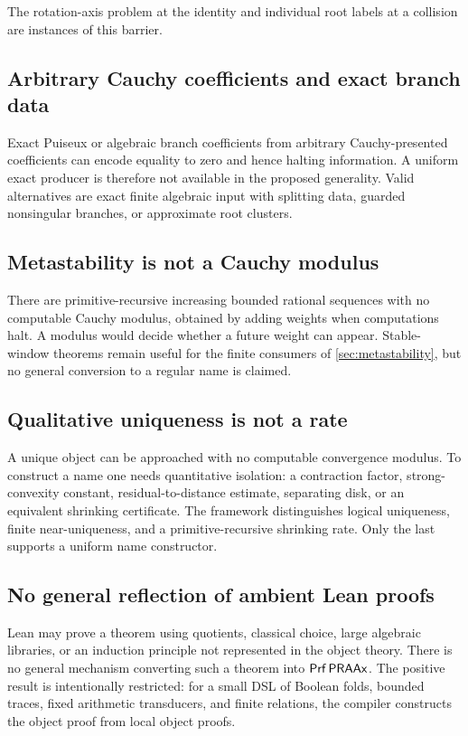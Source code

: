 The rotation-axis problem at the identity and individual root labels at a
collision are instances of this barrier.

\subsection{Arbitrary Cauchy coefficients and exact branch data}

Exact Puiseux or algebraic branch coefficients from arbitrary Cauchy-presented
coefficients can encode equality to zero and hence halting information.  A
uniform exact producer is therefore not available in the proposed generality.
Valid alternatives are exact finite algebraic input with splitting data,
guarded nonsingular branches, or approximate root clusters.

\subsection{Metastability is not a Cauchy modulus}

There are primitive-recursive increasing bounded rational sequences with no
computable Cauchy modulus, obtained by adding weights when computations halt.
A modulus would decide whether a future weight can appear.  Stable-window
theorems remain useful for the finite consumers of \cref{sec:metastability},
but no general conversion to a regular name is claimed.

\subsection{Qualitative uniqueness is not a rate}

A unique object can be approached with no computable convergence modulus.  To
construct a name one needs quantitative isolation: a contraction factor,
strong-convexity constant, residual-to-distance estimate, separating disk, or
an equivalent shrinking certificate.  The framework distinguishes logical
uniqueness, finite near-uniqueness, and a primitive-recursive shrinking rate.
Only the last supports a uniform name constructor.

\subsection{No general reflection of ambient Lean proofs}

Lean may prove a theorem using quotients, classical choice, large algebraic
libraries, or an induction principle not represented in the object theory.
There is no general mechanism converting such a theorem into
\(\mathsf{Prf}\,\mathsf{PRAAx}\).  The positive result is intentionally restricted: for a
small DSL of Boolean folds, bounded traces, fixed arithmetic transducers, and
finite relations, the compiler constructs the object proof from local object
proofs.


